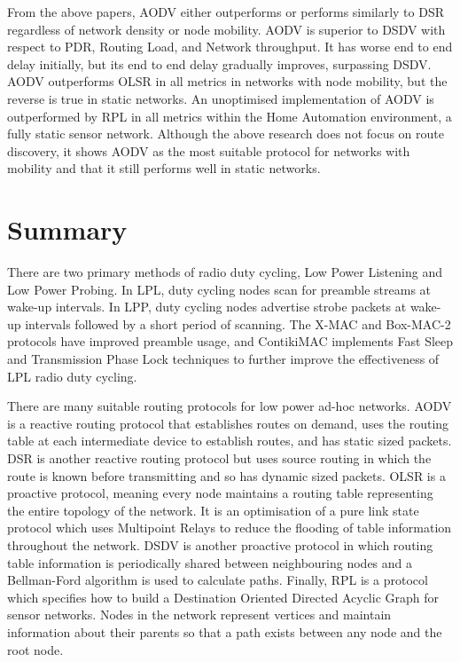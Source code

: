     From the above papers, AODV either outperforms or performs similarly to DSR
    regardless of network density or node mobility. AODV is superior to DSDV
    with respect to PDR, Routing Load, and Network throughput. It has worse
    end to end delay initially, but its end to end delay gradually improves, surpassing
    DSDV. AODV outperforms OLSR in all metrics in networks with node mobility, but
    the reverse is true in static networks. An unoptimised implementation of AODV is
    outperformed by RPL in all metrics within the Home Automation environment,
    a fully static sensor network. Although the above research does not focus on
    route discovery, it shows AODV as the most suitable protocol for networks with
    mobility and that it still performs well in static networks.

    \section{Summary}
    There are two primary methods of radio duty cycling, Low Power Listening and
    Low Power Probing. In LPL, duty cycling nodes scan for preamble streams at
    wake-up intervals. In LPP, duty cycling nodes advertise strobe
    packets at wake-up intervals followed by a short period of scanning. The X-MAC
    and Box-MAC-2 protocols have improved preamble usage, and ContikiMAC implements
    Fast Sleep and Transmission Phase Lock techniques to further improve the
    effectiveness of LPL radio duty cycling.

    There are many suitable routing protocols for low power ad-hoc networks.
    AODV is a reactive routing protocol that establishes routes on demand, uses the
    routing table at each intermediate device to establish routes, and has static
    sized packets. DSR is another reactive routing protocol but uses source
    routing in which the route is known before transmitting and so has dynamic
    sized packets. OLSR is a proactive protocol, meaning every node maintains
    a routing table representing the entire topology of the network. It is an
    optimisation of a pure link state protocol which uses Multipoint Relays to
    reduce the flooding of table information throughout the network. DSDV is another
    proactive protocol in which routing table information is periodically shared
    between neighbouring nodes and a Bellman-Ford algorithm is used to calculate
    paths. Finally, RPL is a protocol which specifies how to build a Destination
    Oriented Directed Acyclic Graph for sensor networks. Nodes in the network represent vertices
    and maintain information about their parents so that a path exists between
    any node and the root node.

